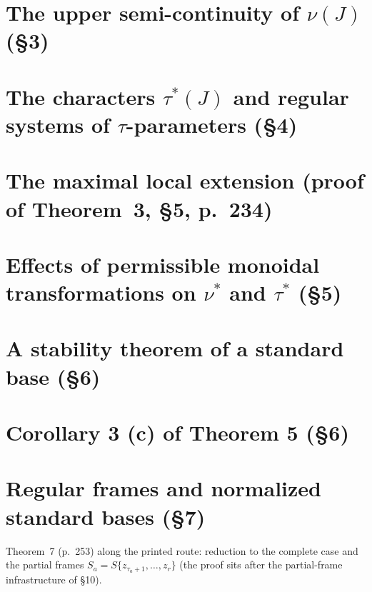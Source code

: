 \section{The upper semi-continuity of $\nu(J)$ (\S3)}

\section{The characters $\tau^*(J)$ and regular systems of $\tau$-parameters (\S4)}

\section{The maximal local extension (proof of Theorem~3, \S5, p.~234)}

\section{Effects of permissible monoidal transformations on $\nu^*$ and $\tau^*$ (\S5)}

\section{A stability theorem of a standard base (\S6)}

\section{Corollary 3 (c) of Theorem 5 (\S6)}

\section{Regular frames and normalized standard bases (\S7)}

Theorem~7 (p.~253) along the printed route: reduction to the complete case and the partial frames
$S_a=S\{z_{\tau_a+1},\dots,z_r\}$ (the proof sits after the partial-frame infrastructure of \S10).


